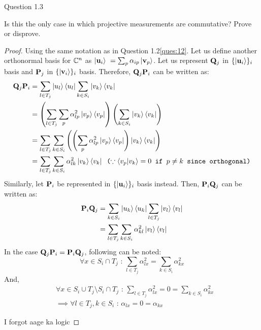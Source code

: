 \begin{solution}{Question 1.3}\label{ques:13}
    \begin{question}
    Is this the only case in which projective measurements are commutative? Prove or disprove.
    \end{question}
    \tcblower{}
    \begin{proof}
    Using the same notation as in Question 1.2\ref{ques:12}. Let us define another orthonormal basis for $\mathbb{C}^n$ as $\ket{\mathbf{u}_i}\ = \sum_p \alpha_{ip}\ket{\mathbf{v}_p}$. Let us represent $\mathbf{Q}_j$ in $\{\ket{\mathbf{u}_i}\}_i$ basis and $\mathbf{P}_j$ in $\{\ket{\mathbf{v}_i}\}_i$ basis. Therefore, $\mathbf{Q}_j \mathbf{P}_i$ can be written as:
    \begin{equation}
        \begin{split}
            \mathbf{Q}_j\mathbf{P}_i &= \sum_{l\in T_j}\ket{u_l}\bra{u_l} \sum_{k\in S_i}\ket{v_k}\bra{v_k} \\ 
            &=\left( \sum_{l\in T_j}\sum_{p}\alpha^2_{lp}\ket{v_p}\bra{v_p} \right) \left( \sum_{k\in S_i} \ket{v_k}\bra{v_k} \right)\\
            &= \sum_{l\in T_j}\sum_{k\in S_i} \left( \left(\sum_{p}\alpha^2_{lp}\ket{v_p}\bra{v_p} \right) \ket{v_k}\bra{v_k} \right)\\
            &= \sum_{l\in T_j} \sum_{k\in S_i}\alpha^2_{lk}\ket{v_k}\bra{v_k} \texttt{ 
        ($\because \braket{v_p|v_k}=0$ if $p\neq k$ since orthogonal)}
        \end{split}
    \end{equation}
    Similarly, let $\mathbf{P}_i$ be represented in $\{\ket{\mathbf{u}_i}\}_i$ basis instead. Then, $\mathbf{P}_i\mathbf{Q}_j$ can be written as:
    \begin{equation}
        \begin{split}
            \mathbf{P}_i\mathbf{Q}_j &= \sum_{k\in S_i}\ket{u_k}\bra{u_k} \sum_{l\in T_j}\ket{v_l}\bra{v_l} \\ 
            &= \sum_{l\in T_j} \sum_{k\in S_i}\alpha^2_{kl}\ket{v_l}\bra{v_l}
        \end{split}
    \end{equation}
    In the case $\mathbf{Q}_j\mathbf{P}_i = \mathbf{P}_i\mathbf{Q}_j$, following can be noted:
    \begin{equation}
        \forall x\in S_i\cap T_j \text{ : }\sum_{l\in T_j}\alpha^2_{lx} = \sum_{k\in S_i}\alpha^2_{kx}
    \end{equation}
    And,
    \begin{equation}
        \begin{split}
            &\forall x\in S_i\cup T_j \setminus S_i\cap T_j \text{ : }\sum_{l\in T_j}\alpha^2_{lx} = 0 = \sum_{k\in S_i}\alpha^2_{kx}\\
            &\implies \forall l\in T_j, k \in S_i \text{ : } \alpha_{lx} = 0 =\alpha_{kx}
        \end{split}
    \end{equation}

    I forgot aage ka logic
    \end{proof}
\end{solution}
